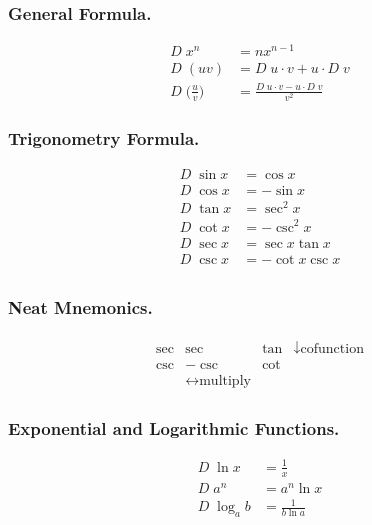 \documentclass[../main.tex]{subfiles}
\begin{document}
\subsubsection{General Formula.}
\begin{align*}
     D\; x^n&=nx^{n-1}\\
     D\; (uv)&= D\;u\cdot v+u\cdot D\;v\\
     D\;\bigg(\frac{u}{v}\bigg)&=\frac{ D\;u\cdot v-u\cdot D\;v}{v^2}
\end{align*}

\subsubsection{Trigonometry Formula.}
\begin{align*}
     D\; \sin x&= \cos x\\
     D\; \cos x&= -\sin x\\
     D\; \tan x&= \sec^2 x\\
     D\; \cot x&= -\csc^2 x\\
     D\; \sec x&= \sec x\tan x\\
     D\; \csc x&= -\cot x\csc x\\
\end{align*}

\subsubsection{Neat Mnemonics.}
\begin{align*}
\begin{matrix}
    \sec&\sec&\tan&\downarrow \textrm{cofunction}\\
    \csc&-\csc&\cot&\\
    &\leftrightarrow\textrm{multiply}
\end{matrix}
\end{align*}

\subsubsection{Exponential and Logarithmic Functions.}
\begin{align*}
     D\; \ln x &= \frac{1}{x}\\
     D\; a^n&=a^n\ln x\\
     D\; \log_a b&=\frac{1}{b\ln a}
\end{align*}
\end{document}
